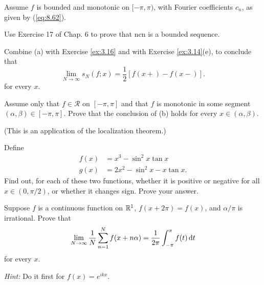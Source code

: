 \begin{myexercise}
    \label{ex:8.17}
    Assume $f$ is bounded and monotonic on $[-\pi, \pi)$, 
    with Fourier coefficients $c_n$, as given by (\ref{eq:8.62}).
    \begin{asparaenum}[(a)]
        \item Use Exercise 17 of Chap. 6 to prove that {ncn} is a bounded sequence.
        \item Combine (a) with Exercise \ref{ex:3.16} and with Exercise \ref{ex:3.14}(e), to conclude that 
        \begin{equation*}
            \lim_{N \to \infty} s_N(f;x) = \frac{1}{2}\left[ f(x+)-f(x-) \right].
        \end{equation*}
        for every $x$.
        \item Assume only that $f \in \mathscr{R}$ on $[-\pi,\pi]$ and that $f$ is monotonic in some segment
        $(\alpha, \beta) \in  [-\pi, \pi]$. 
        Prove that the conclusion of (b) holds for every $x \in (\alpha, \beta)$.
    \end{asparaenum}
    (This is an application of the localization theorem.)
\end{myexercise}


\begin{myexercise}
    \label{ex:8.18}
    Define
    \begin{align*}
        f(x) &= x^3 - \sin^2 x \tan x \\
        g(x) &= 2x^2 - \sin^2 x - x\tan x.
    \end{align*}
    Find out, for each of these two functions, whether it is positive or negative for all $x \in (0, \pi/2)$, or whether it changes sign. 
    Prove your answer.
\end{myexercise}


\begin{myexercise}
    \label{ex:8.19}
    Suppose $f$ is a continuous function on ${\protect\mathbb R}^1$,
    $f(x + 2\pi) = f(x)$, and $\alpha/\pi$ is irrational.
    Prove that
    \begin{equation*}
        \lim_{N \to \infty} \frac{1}{N} \sum_{n=1}^{N} f(x+n\alpha) = \frac{1}{2\pi} \int_{-\pi}^{\pi} f(t) \d t
    \end{equation*}
    for every $x$.

    \emph{Hint:} Do it first for $f(x) = e^{ikx}$.
\end{myexercise}


